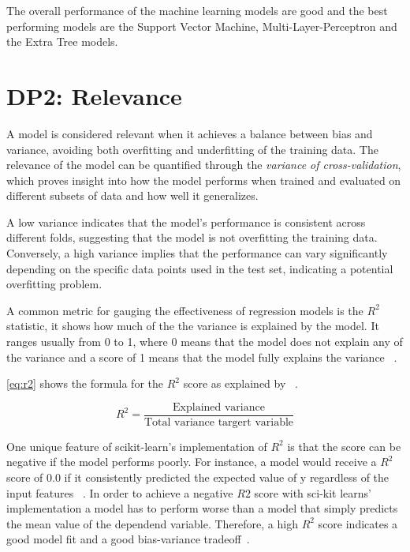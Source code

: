 The overall performance of the machine learning models are good and the best performing models are the
Support Vector Machine, Multi-Layer-Perceptron and the Extra Tree models.


\section{DP2: Relevance}\label{sec:relevance}

A model is considered relevant when it achieves a balance between bias and
variance, avoiding both overfitting and underfitting of the training data.
The relevance of the model can be quantified through the \textit{variance of cross-validation}, which proves insight
into how the model performs when trained and
evaluated on different subsets of data and how well it generalizes.

A low variance indicates that the model's performance is consistent across
different folds, suggesting that the model is not overfitting the training data.
Conversely, a high variance implies that the performance can vary significantly
depending on the specific data points used in the test set, indicating a potential
overfitting problem.

A common metric for gauging the effectiveness of regression models is the $R^2$ statistic, it shows how much of the
the variance is explained by the model.
It ranges usually from 0 to 1, where 0 means that the model does not explain any of the variance and a score of 1
means that the model fully explains the variance
~\cite[p. 43]{muller2016introduction}.

\cref{eq:r2} shows the formula for the $R^2$ score as explained by
~\cite[p. 43]{muller2016introduction}.

\begin{tcolorbox}[arc=0pt,boxrule=0.5pt]
    \begin{equation}
        \label{eq:r2}
        R^2 = \frac{\text{Explained variance}}{\text{Total variance targert variable}}
    \end{equation}
\end{tcolorbox}

One unique feature of scikit-learn's implementation of $R^2$ is that the score can be negative if the model performs
poorly.
For instance, a model would receive a $R^2$ score of 0.0 if it consistently predicted the expected value of y
regardless of the input features
~\cite{scikit-learn}.
In order to achieve a negative $R2$ score with sci-kit learns' implementation a model has to perform worse than a
model that simply predicts the mean value of the dependend variable.
Therefore, a high $R^2$ score indicates a good model fit and a good bias-variance
tradeoff~\cite[p. 43]{muller2016introduction}.

